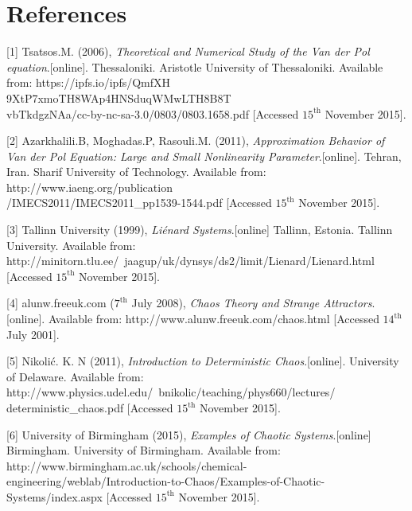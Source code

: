 \documentclass[11pt,a4paper]{amsart}
\begin{document}
\newpage
\section{References}

[1]	Tsatsos.M. (2006), \textit{Theoretical and Numerical Study of the Van der Pol equation}.[online]. Thessaloniki. Aristotle University of Thessaloniki. Available from: https://ipfs.io/ipfs/QmfXH\\9XtP7xmoTH8WAp4HNSduqWMwLTH8B8T\\vbTkdgzNAa/cc-by-nc-sa-3.0/0803/0803.1658.pdf [Accessed $15^\text{th}$ November 2015].

[2]	Azarkhalili.B, Moghadas.P, Rasouli.M. (2011), \textit{Approximation Behavior of Van der Pol Equation: 
Large and Small Nonlinearity Parameter}.[online]. Tehran, Iran. Sharif University of Technology. Available from: http://www.iaeng.org/publication\\/IMECS2011/IMECS2011\_pp1539-1544.pdf [Accessed $15^{\text{th}}$ November 2015].

[3]	Tallinn University (1999), \textit{Li\'enard Systems}.[online] Tallinn, Estonia. Tallinn University. Available from: http://minitorn.tlu.ee/~jaagup/uk/dynsys/ds2/limit/Lienard/Lienard.html [Accessed $15^\text{th}$ November 2015].

[4]	alunw.freeuk.com ($7^{\text{th}}$ July 2008), \textit{Chaos Theory and Strange Attractors}.[online]. Available from: http://www.alunw.freeuk.com/chaos.html [Accessed $14^{\text{th}}$ July 2001].

[5]	Nikoli\'c. K. N (2011), \textit{Introduction to Deterministic Chaos}.[online]. University of Delaware. Available from: http://www.physics.udel.edu/~bnikolic/teaching/phys660/lectures/\\deterministic\_chaos.pdf [Accessed $15^\text{th}$ November 2015].

[6]	University of Birmingham (2015), \textit{Examples of Chaotic Systems}.[online] Birmingham. University of Birmingham. Available from: http://www.birmingham.ac.uk/schools/chemical-\\engineering/weblab/Introduction-to-Chaos/Examples-of-Chaotic-Systems/index.aspx [Accessed $15^\text{th}$ November 2015].
\end{document}
